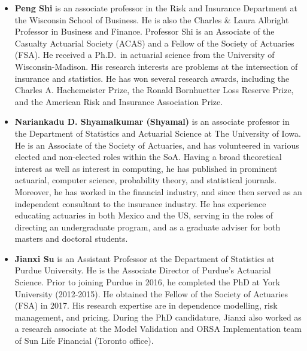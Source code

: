 \documentclass[]{book}
\providecommand{\tightlist}{%
  \setlength{\itemsep}{0pt}\setlength{\parskip}{0pt}}
\begin{document}
\begin{itemize}
\tightlist
\item
  \textbf{Peng Shi} is an associate professor in the Risk and Insurance
  Department at the Wisconsin School of Business. He is also the Charles
  \& Laura Albright Professor in Business and Finance. Professor Shi is
  an Associate of the Casualty Actuarial Society (ACAS) and a Fellow of
  the Society of Actuaries (FSA). He received a Ph.D.~in actuarial
  science from the University of Wisconsin-Madison. His research
  interests are problems at the intersection of insurance and
  statistics. He has won several research awards, including the Charles
  A. Hachemeister Prize, the Ronald Bornhuetter Loss Reserve Prize, and
  the American Risk and Insurance Association Prize.
\end{itemize}

\begin{itemize}
\tightlist
\item
  \textbf{Nariankadu D. Shyamalkumar (Shyamal)} is an associate
  professor in the Department of Statistics and Actuarial Science at The
  University of Iowa. He is an Associate of the Society of Actuaries,
  and has volunteered in various elected and non-elected roles within
  the SoA. Having a broad theoretical interest as well as interest in
  computing, he has published in prominent actuarial, computer science,
  probability theory, and statistical journals. Moreover, he has worked
  in the financial industry, and since then served as an independent
  consultant to the insurance industry. He has experience educating
  actuaries in both Mexico and the US, serving in the roles of directing
  an undergraduate program, and as a graduate adviser for both masters
  and doctoral students.
\end{itemize}

\begin{itemize}
\tightlist
\item
  \textbf{Jianxi Su} is an Assistant Professor at the Department of
  Statistics at Purdue University. He is the Associate Director of
  Purdue's Actuarial Science. Prior to joining Purdue in 2016, he
  completed the PhD at York University (2012-2015). He obtained the
  Fellow of the Society of Actuaries (FSA) in 2017. His research
  expertise are in dependence modelling, risk management, and pricing.
  During the PhD candidature, Jianxi also worked as a research associate
  at the Model Validation and ORSA Implementation team of Sun Life
  Financial (Toronto office).
\end{itemize}
\end{document}
